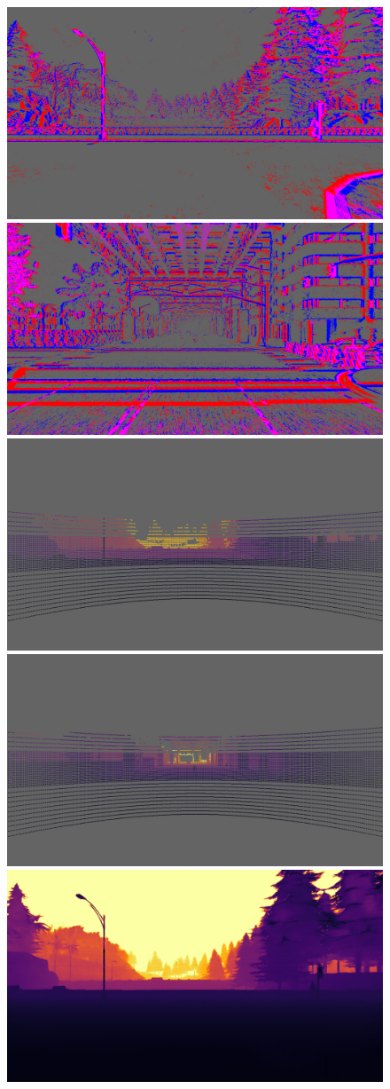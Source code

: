 \begin{figure}
  \centering
  \includegraphics[width=0.475\linewidth]{mainmatter/figures/b_depth_conv/sled_dense_cmp_additional/evts003720_lightgray_fixed.png}
  \includegraphics[width=0.475\linewidth]{mainmatter/figures/b_depth_conv/sled_dense_cmp_additional/evts006552_lightgray_fixed.png}
  \includegraphics[width=0.475\linewidth]{mainmatter/figures/b_depth_conv/sled_dense_cmp_additional/lidar003720_lightgray_fixed.png}
  \includegraphics[width=0.475\linewidth]{mainmatter/figures/b_depth_conv/sled_dense_cmp_additional/lidar006552_lightgray_fixed.png}
  \includegraphics[width=0.475\linewidth]{mainmatter/figures/b_depth_conv/sled_dense_cmp_additional/prev003720.png}

\end{figure}
